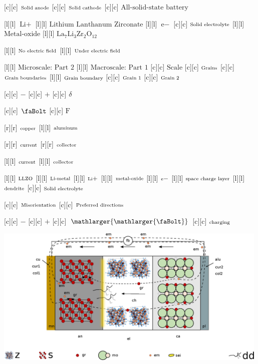 [c][c] {$\text{\scriptsize Solid anode}$}
[c][c] {$\text{\scriptsize Solid cathode}$}
[c][c] {$\text{All-solid-state battery}$}

[l][l] {$\text{Li}+$}
[l][l] {$\text{Lithium Lanthanum Zirconate}$}
[l][l] {$\text{e}-$}
[c][c] {$\text{\scriptsize Solid electrolyte}$}
[l][l] {$\text{Metal-oxide}$}
[l][l] {$\text{La}_{7}\text{Li}_{3}\text{Zr}_{2}\text{O}_{12}$}

[l][l] {$\text{\scriptsize  No electric field}$}
[l][l] {$\text{\scriptsize  Under electric field}$}

[l][l] {$\text{Microscale: Part 2}$}
[l][l] {$\text{Macroscale: Part 1}$}
[c][c] {$\text{Scale}$}
[c][c] {$\text{\scriptsize Grains}$}
[c][c] {$\text{\scriptsize Grain boundaries}$}
[l][l] {$\text{\scriptsize Grain boundary}$}
[c][c] {$\text{\scriptsize Grain 1}$}
[c][c] {$\text{\scriptsize Grain 2}$}

[c][c] {$-$}
[c][c] {$+$}
[c][c] {$\delta$}

[c][c] {$\text{\faBolt}$}
[c][c] {$\text{F}$}

[r][r] {$\scriptsize  \text{copper}$}
[l][l] {$\scriptsize  \text{aluminum}$}

[r][r] {$\scriptsize  \text{current}$}
[r][r] {$\scriptsize  \text{collector}$}

[l][l] {$\scriptsize  \text{current}$}
[l][l] {$\scriptsize  \text{collector}$}

[l][l] {$\scriptsize \text{LLZO}$}
[l][l] {$\scriptsize \text{Li-metal}$}
[l][l] {$\scriptsize \text{Li}+$}
[l][l] {$\scriptsize \text{metal-oxide}$}
[l][l] {$\scriptsize \text{e}-$}
[l][l] {$\scriptsize \text{space charge layer}$}
[l][l] {$\scriptsize \text{dendrite}$}
[c][c] {$\scriptsize  \text{Solid electrolyte}$}

[c][c] {$\scriptsize  \text{Misorientation}$}
[c][c] {$\scriptsize  \text{Preferred directions}$}

[c][c] {$-$}
[c][c] {$+$}
[c][c] {$\mathlarger{\mathlarger{\text{\faBolt}}}$}
[c][c] {$\scriptsize  \text{charging}$}

\includegraphics[width=0.99\textwidth]{dendrite_pdirection_battonly.eps}
